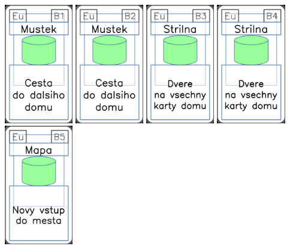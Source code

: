 \documentclass[a4paper]{article}
\begin{document}
	\includegraphics[width=3.0cm]{img-4_35}
	\includegraphics[width=3.0cm]{img-4_36}
	\includegraphics[width=3.0cm]{img-4_37}
	\includegraphics[width=3.0cm]{img-4_38}
	\includegraphics[width=3.0cm]{img-4_39}
\end{document}
